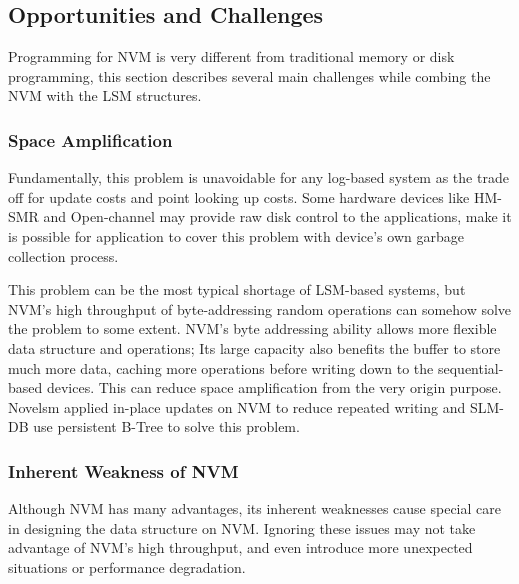 \subsection{Opportunities and Challenges}
Programming for NVM is very different from traditional memory or disk programming, this section describes several main challenges while combing the NVM with the LSM structures.

\subsubsection{Space Amplification}
Fundamentally, this problem is unavoidable for any log-based system as the trade off for update costs and point looking up costs. Some hardware devices like HM-SMR and Open-channel may provide raw disk control to the applications, make it is possible for application to cover this problem with device's own garbage collection process\cite{zhang2017flashkv}.

This problem can be the most typical shortage of LSM-based systems, but NVM's high throughput of byte-addressing random operations can somehow solve the problem to some extent. NVM's byte addressing ability allows more flexible data structure and operations; Its large capacity also benefits the buffer to store much more data, caching more operations before writing down to the sequential-based devices. This can reduce space amplification from the very origin purpose. Novelsm\cite{kannan2018redesigning} applied in-place updates on NVM to reduce repeated writing and SLM-DB use persistent B-Tree to solve this problem.


%

\subsubsection{Inherent Weakness of NVM}
Although NVM has many advantages, its inherent weaknesses cause special care in designing the data structure on NVM. Ignoring these issues may not take advantage of NVM's high throughput, and even introduce more unexpected situations or performance degradation.

